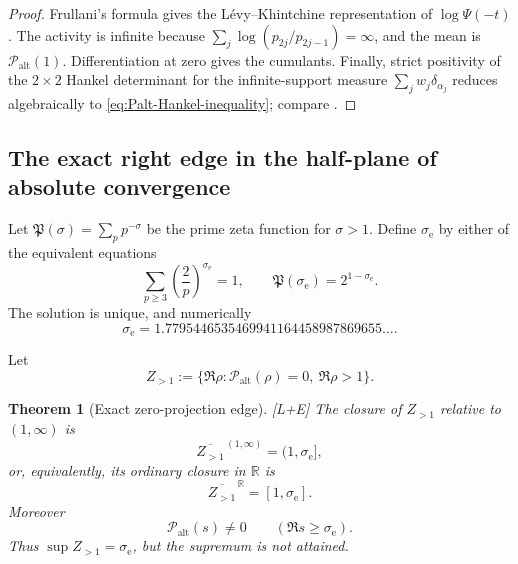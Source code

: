 \documentclass[11pt]{article}
\newtheorem{theorem}{Theorem}[section]
\theoremstyle{definition}
\theoremstyle{remark}
\newcommand{\Palt}{\mathcal P_{\mathrm{alt}}}
\newcommand{\cP}{\mathfrak P}
\newcommand{\status}[1]{\textnormal{\textcolor{accent}{\footnotesize[#1]}}}
\begin{document}
\begin{proof}
Frullani's formula gives the L\'evy--Khintchine representation of
$\log\Psi(-t)$.  The activity is infinite because
$\sum_j\log(p_{2j}/p_{2j-1})=\infty$, and the mean is $\Palt(1)$.
Differentiation at zero gives the cumulants.  Finally, strict positivity of the
$2\times2$ Hankel determinant for the infinite-support measure
$\sum_jw_j\delta_{\alpha_j}$ reduces algebraically to
\eqref{eq:Palt-Hankel-inequality}; compare \cite{SchillingBernstein}.
\end{proof}

\subsection{The exact right edge in the half-plane of absolute convergence}

Let $\cP(\sigma)=\sum_pp^{-\sigma}$ be the prime zeta function for $\sigma>1$.
Define $\sigma_{\mathrm e}$ by either of the equivalent equations
\begin{equation}\label{eq:sigma-edge}
 \sum_{p\ge3}\left(\frac2p\right)^{\sigma_{\mathrm e}}=1,
 \qquad
 \cP(\sigma_{\mathrm e})=2^{1-\sigma_{\mathrm e}}.
\end{equation}
The solution is unique, and numerically
\begin{equation}\label{eq:sigma-edge-numeric}
 \sigma_{\mathrm e}
 =1.7795446535469941164458987869655\ldots.
\end{equation}

Let
\[
 Z_{>1}:=\{\Re\rho:\Palt(\rho)=0,\ \Re\rho>1\}.
\]

\begin{theorem}[Exact zero-projection edge]\label{thm:Palt-edge}
\status{L+E}
The closure of $Z_{>1}$ relative to $(1,\infty)$ is
\begin{equation}\label{eq:Palt-relative-closure}
 \overline{Z_{>1}}^{\,(1,\infty)}=(1,\sigma_{\mathrm e}],
\end{equation}
or, equivalently, its ordinary closure in $\mathbb R$ is
\begin{equation}\label{eq:Palt-ordinary-closure}
 \overline{Z_{>1}}^{\,\mathbb R}=[1,\sigma_{\mathrm e}].
\end{equation}
Moreover
\begin{equation}\label{eq:Palt-zero-free-edge}
 \Palt(s)\ne0\qquad(\Re s\ge\sigma_{\mathrm e}).
\end{equation}
Thus $\sup Z_{>1}=\sigma_{\mathrm e}$, but the supremum is not attained.
\end{theorem}
\end{document}
